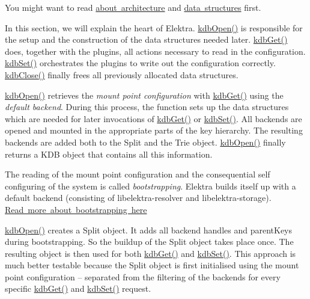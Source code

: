 You might want to read \mbox{\hyperlink{doc_dev_architecture_md}{about architecture}} and \mbox{\hyperlink{doc_dev_data-structures_md}{data structures}} first.

In this section, we will explain the heart of Elektra. {\ttfamily \mbox{\hyperlink{group__kdb_ga6808defe5870f328dd17910aacbdc6ca}{kdb\+Open()}}} is responsible for the setup and the construction of the data structures needed later. {\ttfamily \mbox{\hyperlink{group__kdb_ga28e385fd9cb7ccfe0b2f1ed2f62453a1}{kdb\+Get()}}} does, together with the plugins, all actions necessary to read in the configuration. {\ttfamily \mbox{\hyperlink{group__kdb_ga11436b058408f83d303ca5e996832bcf}{kdb\+Set()}}} orchestrates the plugins to write out the configuration correctly. {\ttfamily \mbox{\hyperlink{group__kdb_gadb54dc9fda17ee07deb9444df745c96f}{kdb\+Close()}}} finally frees all previously allocated data structures.

{\ttfamily \mbox{\hyperlink{group__kdb_ga6808defe5870f328dd17910aacbdc6ca}{kdb\+Open()}}} retrieves the {\itshape mount point configuration} with {\ttfamily \mbox{\hyperlink{group__kdb_ga28e385fd9cb7ccfe0b2f1ed2f62453a1}{kdb\+Get()}}} using the {\itshape default backend}. During this process, the function sets up the data structures which are needed for later invocations of {\ttfamily \mbox{\hyperlink{group__kdb_ga28e385fd9cb7ccfe0b2f1ed2f62453a1}{kdb\+Get()}}} or {\ttfamily \mbox{\hyperlink{group__kdb_ga11436b058408f83d303ca5e996832bcf}{kdb\+Set()}}}. All backends are opened and mounted in the appropriate parts of the key hierarchy. The resulting backends are added both to the {\ttfamily Split} and the {\ttfamily Trie} object. {\ttfamily \mbox{\hyperlink{group__kdb_ga6808defe5870f328dd17910aacbdc6ca}{kdb\+Open()}}} finally returns a {\ttfamily K\+DB} object that contains all this information.

The reading of the mount point configuration and the consequential self configuring of the system is called {\itshape bootstrapping}. Elektra builds itself up with a default backend (consisting of {\ttfamily libelektra-\/resolver} and {\ttfamily libelektra-\/storage}). \mbox{\hyperlink{doc_help_elektra-bootstrapping_md}{Read more about bootstrapping here}}

{\ttfamily \mbox{\hyperlink{group__kdb_ga6808defe5870f328dd17910aacbdc6ca}{kdb\+Open()}}} creates a {\ttfamily Split} object. It adds all backend handles and {\ttfamily parent\+Keys} during bootstrapping. So the buildup of the {\ttfamily Split} object takes place once. The resulting object is then used for both {\ttfamily \mbox{\hyperlink{group__kdb_ga28e385fd9cb7ccfe0b2f1ed2f62453a1}{kdb\+Get()}}} and {\ttfamily \mbox{\hyperlink{group__kdb_ga11436b058408f83d303ca5e996832bcf}{kdb\+Set()}}}. This approach is much better testable because the {\ttfamily Split} object is first initialised using the mount point configuration -- separated from the filtering of the backends for every specific {\ttfamily \mbox{\hyperlink{group__kdb_ga28e385fd9cb7ccfe0b2f1ed2f62453a1}{kdb\+Get()}}} and {\ttfamily \mbox{\hyperlink{group__kdb_ga11436b058408f83d303ca5e996832bcf}{kdb\+Set()}}} request.

